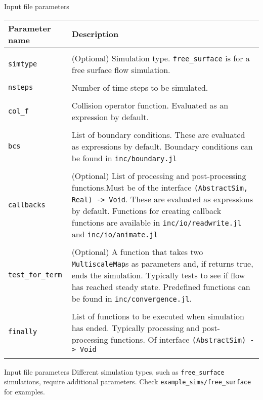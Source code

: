 \documentclass[pdf]{beamer}
\begin{document}
\begin{frame}{Input file parameters}
\begin{table}
    \tiny
    \centering
    \begin{tabularx}{\textwidth}{l X}
      \textbf{Parameter name} & \textbf{Description} \\
      \hline \\
      \texttt{simtype} & (Optional) Simulation type. \texttt{free\_surface} is for a free surface flow simulation. \\
      \\
      \texttt{nsteps} & Number of time steps to be simulated. \\
      \\
      \texttt{col\_f} & Collision operator function. Evaluated as an expression by default. \\
      \\
      \texttt{bcs} & List of boundary conditions. These are evaluated as expressions by default. Boundary conditions can be found in \texttt{inc/boundary.jl}\\
      \\
      \texttt{callbacks} & (Optional) List of processing and post-processing functions.Must be of the interface \texttt{(AbstractSim, Real) -> Void}. These are evaluated as expressions by default. Functions for creating callback functions are available in \texttt{inc/io/readwrite.jl} and \texttt{inc/io/animate.jl}\\
      \\
      \texttt{test\_for\_term} & (Optional) A function that takes two \texttt{MultiscaleMap}s as parameters and, if returns true, ends the simulation. Typically tests to see if flow has reached steady state. Predefined functions can be found in \texttt{inc/convergence.jl}.\\
      \\
      \texttt{finally} & List of functions to be executed when simulation has ended. Typically processing and post-processing functions. Of interface \texttt{(AbstractSim) -> Void}\\
      \\
    \end{tabularx}
  \end{table}
\end{frame}

\begin{frame}{Input file parameters}
  Different simulation types, such as \texttt{free\_surface} simulations, require additional parameters. Check \texttt{example\_sims/free\_surface} for examples.
\end{frame}
\end{document}
